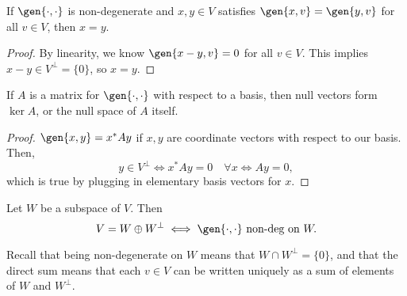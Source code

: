 \begin{theorem}
\lemlabel

If $\gen{\cdot, \cdot}$ is non-degenerate and $x,y\in V$ satisfies $\gen{x,v} = \gen{y,v}$ for all $v\in V$, then $x=y$. 
\end{theorem}

\begin{proof}
By linearity, we know $\gen{x-y,v}=0$ for all $v\in V$. This implies $x-y\in V^{\perp} = \{0\}$, so $x=y$. 
\end{proof}

\begin{theorem}
\proplabel

If $A$ is a matrix for $\gen{\cdot, \cdot}$ with respect to a basis, then null vectors form $\ker A$, or the null space of $A$ itself. 
\end{theorem}

\begin{proof}
$\gen{x,y} = x^*Ay$ if $x,y$ are coordinate vectors with respect to our basis. Then, 
\[y\in V^{\perp}\iff x^*Ay = 0\quad\forall x \iff Ay=0,\]
which is true by plugging in elementary basis vectors for $x$. 
\end{proof}

\begin{theorem}
\thmlabel

Let $W$ be a subspace of $V$. Then 
\[V = W\oplus W^{\perp}\iff \gen{\cdot, \cdot}\text{ non-deg on }W.\]
\end{theorem}

Recall that being non-degenerate on $W$ means that $W\cap W^{\perp} = \{0\}$, and that the direct sum means that each $v\in V$ can be written uniquely as a sum of elements of $W$ and $W^{\perp}$. 

